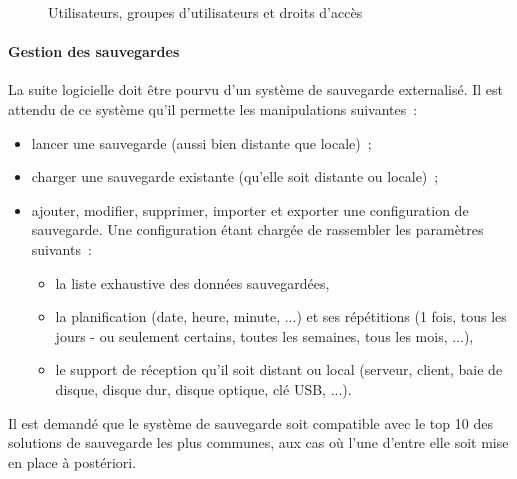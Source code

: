 \begin{figure}[htbp]
	\centering
	\caption{Utilisateurs, groupes d'utilisateurs et droits d'accès}
	\label{ar}
\end{figure}

\paragraph{Gestion des sauvegardes}
La suite logicielle doit être pourvu d'un système de sauvegarde externalisé. Il est attendu de ce système qu'il permette les manipulations suivantes~:
\begin{itemize}
	\item lancer une sauvegarde (aussi bien distante que locale)~;
	\item charger une sauvegarde existante (qu'elle soit distante ou locale)~;
	\item ajouter, modifier, supprimer, importer et exporter une configuration de sauvegarde. Une configuration étant chargée de rassembler les paramètres suivants~:
	\begin{itemize}
		\item la liste exhaustive des données sauvegardées,
		\item la planification (date, heure, minute, ...) et ses répétitions (1 fois, tous les jours - ou seulement certains, toutes les semaines, tous les mois, ...),
		\item le support de réception qu'il soit distant ou local (serveur, client, baie de disque, disque dur, disque optique, clé USB, ...).
	\end{itemize}
\end{itemize}
\begin{constraint}
Il est demandé que le système de sauvegarde soit compatible avec le top 10 des solutions de sauvegarde les plus communes, aux cas où l'une d'entre elle soit mise en place à postériori.
\end{constraint}

